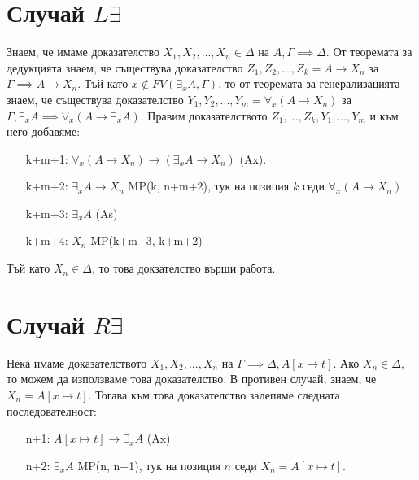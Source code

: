 \documentclass[12pt]{article}
\begin{document}
\section*{Случай $L \exists$}
Знаем, че имаме доказателство $X_1, X_2, ..., X_n \in \Delta$ на $A, \Gamma \implies \Delta$. От теоремата за дедукцията знаем, че съществува доказателство $Z_1, Z_2, ..., Z_k = A \rightarrow X_n$ за $\Gamma \implies A \rightarrow X_n$. Тъй като $x \not\in FV(\exists_x A, \Gamma)$, то от теоремата за генерализацията знаем, че съществува доказателство $Y_1, Y_2, ..., Y_m = \forall_x (A \rightarrow X_n)$ за $\Gamma, \exists_x A \implies \forall_x (A \rightarrow \exists_x A)$. Правим доказателството $Z_1, ..., Z_k, Y_1, ..., Y_m$ и към него добавяме:
\begin{itemize}[itemindent=4em]
    \item[k+m+1: ] $\forall_x(A \rightarrow X_n) \rightarrow (\exists_x A \rightarrow X_n)$ (Ax).
    \item[k+m+2: ] $\exists_x A \rightarrow X_n$  MP(k, n+m+2), тук на позиция $k$ седи $\forall_x(A \rightarrow X_n)$.
    \item[k+m+3: ] $\exists_x A$ (As)
    \item[k+m+4: ] $X_n$ MP(k+m+3, k+m+2)    
\end{itemize}
Тъй като $X_n \in \Delta$, то това докзателство върши работа.

\section*{Случай $R \exists$}
Нека имаме доказателството $X_1, X_2, ..., X_n$ на $\Gamma \implies \Delta, A[x \longmapsto t]$. Ако $X_n \in \Delta$, то можем да използваме това доказателство. В противен случай, знаем, че $X_n = A[x \longmapsto t]$. Тогава към това доказателство залепяме следната последователност:
\begin{itemize}[itemindent=4em]
    \item[n+1: ] $A[x \longmapsto t] \rightarrow \exists_x A$ (Ax)
    \item[n+2: ] $\exists_x A$ MP(n, n+1), тук на позиция $n$ седи $X_n = A[x \longmapsto t]$. 
\end{itemize}
\end{document}
